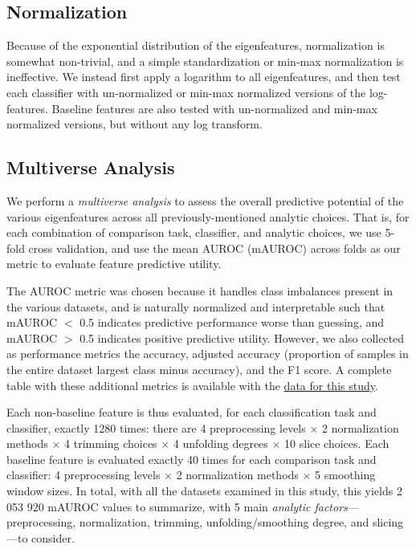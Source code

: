 \documentclass[12pt]{spieman}  %
\begin{document}
\begin{spacing}{2}
\subsection{Normalization}

Because of the exponential distribution of the eigenfeatures, normalization is
somewhat non-trivial, and a simple standardization or min-max normalization is
ineffective. We instead first apply a logarithm to all eigenfeatures, and then
test each classifier with un-normalized or min-max normalized versions of the
log-features. Baseline features are also tested with un-normalized and min-max
normalized versions, but without any log transform.





\subsection{Multiverse Analysis}
\label{sec:multiverse}

We perform a \textit{multiverse
analysis}\cite{steegenIncreasingTransparencyMultiverse2016} to assess the
overall predictive potential of the various eigenfeatures across all
previously-mentioned analytic choices. That is, for each combination of
comparison task, classifier, and analytic choices, we use 5-fold cross
validation, and use the mean AUROC (mAUROC) across folds as our metric to
evaluate feature predictive utility.

The AUROC metric was chosen because it handles class imbalances present in the
various datasets, and is naturally normalized and interpretable such that
mAUROC \(<\) 0.5 indicates predictive performance worse than guessing, and
mAUROC \(>\) 0.5 indicates positive predictive
utility\cite{mandrekarReceiverOperatingCharacteristic2010}. However, we also
collected as performance metrics the accuracy, adjusted accuracy (proportion of
samples in the entire dataset largest class minus accuracy), and the F1 score.
A complete table with these additional metrics is available with the
\hyperref[sec:data-and-code]{data for this study}.

Each non-baseline feature is thus evaluated, for each classification task and
classifier, exactly 1280 times: there are 4 preprocessing levels \(\times\) 2
normalization methods \(\times\) 4 trimming choices \(\times\) 4 unfolding
degrees  \(\times\) 10 slice choices. Each baseline feature is evaluated
exactly 40 times for each comparison task and classifier: 4 preprocessing
levels \(\times\) 2 normalization methods \(\times\) 5 smoothing window sizes.
In total, with all the datasets examined in this study, this yields 2 053 920
mAUROC values to summarize, with 5 main \textit{analytic factors}—
preprocessing, normalization, trimming, unfolding/smoothing degree, and
slicing—to consider.


\end{spacing}
\end{document}
